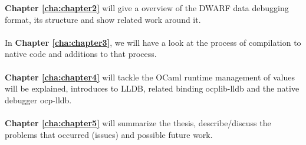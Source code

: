 \textbf{Chapter \ref{cha:chapter2}} will give a overview of the DWARF
data debugging format, its structure and show related work around it.
\\
\\
In \textbf{Chapter \ref{cha:chapter3}}, we will have a look at the process of
compilation to native code and additions to that process.
\\
\\
\textbf{Chapter \ref{cha:chapter4}} will tackle the OCaml runtime management of
values will be explained, introduces to LLDB, related binding ocplib-lldb and
the native debugger ocp-lldb.
\\
\\
\textbf{Chapter \ref{cha:chapter5}} will summarize the thesis,
describe/discuss the problems that occurred (issues) and possible future work.
